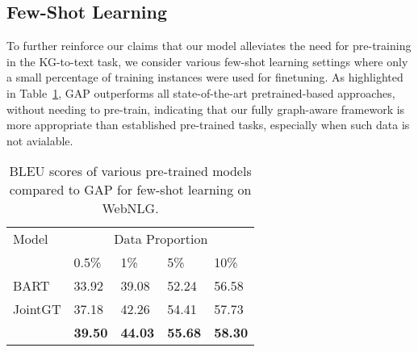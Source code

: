 \documentclass[11pt]{article}
\begin{document}
\subsection{Few-Shot Learning}
To further reinforce our claims that our model alleviates the need for pre-training in the KG-to-text task, we consider various few-shot learning settings where only a small percentage of training instances were used for finetuning. As highlighted in Table~\ref{tab:few-shot}, GAP outperforms all state-of-the-art pretrained-based approaches, without needing to pre-train, indicating that our fully graph-aware framework is more appropriate than established pre-trained tasks, especially when such data is not avialable.

\begin{table}[]
\centering
\begin{tabular}{l|llll}
\hline
Model                 & \multicolumn{4}{c}{Data Proportion} \\ \cline{2-5} 
                      & 0.5\%   & 1\%     & 5\%    & 10\%   \\ \hline
BART                  & 33.92   & 39.08   & 52.24  & 56.58  \\
JointGT & 37.18   & 42.26   & 54.41  & 57.73  \\ \hline
\textbf{} & \textbf{39.50} & \textbf{44.03} & \textbf{55.68} & \textbf{58.30} \\ \hline
\end{tabular}\caption{\label{tab:few-shot}BLEU scores of various pre-trained models compared to GAP for few-shot learning on WebNLG.}

\end{table}
\end{document}
